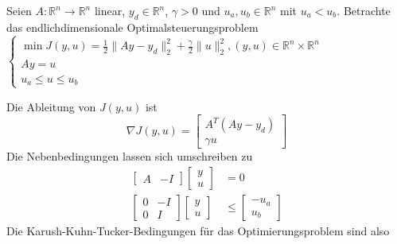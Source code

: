 
Seien $A: \mathbb R^n\to \mathbb R^n$ linear, $y_d\in\mathbb R^n$, $\gamma>0$ und $u_a,u_b\in\mathbb R^n$ mit $u_a<u_b$. Betrachte das endlichdimensionale Optimalsteuerungsproblem
$\begin{cases}\min J(y,u)=\frac{1}{2}\|Ay-y_d\|_2^2+\frac{\gamma}{2}\|u\|_2^2, (y,u)\in\mathbb R^n\times \mathbb R^n\\Ay=u\\u_a\leq u\leq u_b\end{cases}$
\begin{compactenum}[(i)]
\item 
Die Ableitung von $J(y,u)$ ist
$$\nabla J(y,u)=\begin{bmatrix}A^T(Ay-y_d)\\\gamma u\end{bmatrix}$$
Die Nebenbedingungen lassen sich umschreiben zu
\begin{align*}\begin{bmatrix}A&-I\end{bmatrix}\begin{bmatrix}y\\u\end{bmatrix}&=0\\
\begin{bmatrix}0&-I\\0&I\end{bmatrix}\begin{bmatrix}y\\u\end{bmatrix}&\leq \begin{bmatrix}-u_a\\u_b\end{bmatrix}
\end{align*}
Die Karush-Kuhn-Tucker-Bedingungen für das Optimierungsproblem sind also
\begin{align*}

\end{align*}
\end{compactenum}
